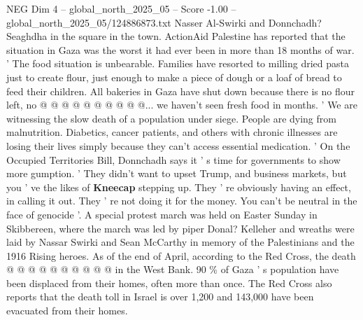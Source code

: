 \begin{textsample}{NEG Dim 4 – global\_north\_2025\_05 – Score -1.00 – global\_north\_2025\_05/124886873.txt}
Nasser Al-Swirki and Donnchadh?
Seaghdha in the square in the town.
ActionAid Palestine has reported that the situation in Gaza was the worst it had ever been in more than 18 months of war. ' The food situation is unbearable.
Families have resorted to milling dried pasta just to create flour, just enough to make a piece of dough or a loaf of bread to feed their children.
All bakeries in Gaza have shut down because there is no flour left, no @ @ @ @ @ @ @ @ @ @... we haven't seen fresh food in months. ' We are witnessing the slow death of a population under siege.
People are dying from malnutrition.
Diabetics, cancer patients, and others with chronic illnesses are losing their lives simply because they can't access essential medication. ' On the Occupied Territories Bill, Donnchadh says it ' s time for governments to show more gumption. ' They didn't want to upset Trump, and business markets, but you ' ve the likes of \textbf{Kneecap} stepping up.
They ' re obviously having an effect, in calling it out.
They ' re not doing it for the money.
You can't be neutral in the face of genocide '.
A special protest march was held on Easter Sunday in Skibbereen, where the march was led by piper Donal?
Kelleher and wreaths were laid by Nassar Swirki and Sean McCarthy in memory of the Palestinians and the 1916 Rising heroes.
As of the end of April, according to the Red Cross, the death @ @ @ @ @ @ @ @ @ @ in the West Bank. 90 \% of Gaza ' s population have been displaced from their homes, often more than once.
The Red Cross also reports that the death toll in Israel is over 1,200 and 143,000 have been evacuated from their homes.

\end{textsample}

